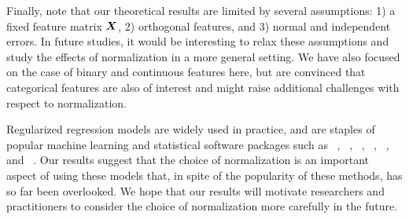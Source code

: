 Finally, note that our theoretical results are limited by several assumptions: 1) a fixed
feature matrix \(\bm{X}\), 2) orthogonal features, and 3) normal and independent errors.
In future studies, it would be interesting to relax these assumptions and study the effects
of normalization in a more general setting. We have also focused on the case of binary and
continuous features here, but are convinced that categorical features are also of interest
and might raise additional challenges with respect to normalization.

Regularized regression models are widely used in practice, and are staples of popular
machine learning and statistical software packages such as
~\citep{friedman2010}, ~\citep{pedregosa2011},
~\citep{curtin2023}, ~\citep{bertrand2022},
~\citep{fan2008a}, and ~\citep{themathworksinc.2022}. Our
results suggest that the choice of normalization is an important aspect of using these
models that, in spite of the popularity of these methods, has so far been overlooked. We
hope that our results will motivate researchers and practitioners to consider the choice of
normalization more carefully in the future.
